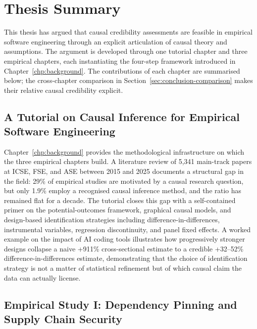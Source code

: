 \section{Thesis Summary}
\label{sec:conclusion-summary}

This thesis has argued that causal credibility assessments are feasible in empirical software engineering through an explicit articulation of causal theory and assumptions.
The argument is developed through one tutorial chapter and three empirical chapters, each instantiating the four-step framework introduced in Chapter~\ref{chp:background}.
The contributions of each chapter are summarised below; the cross-chapter comparison in Section~\ref{sec:conclusion-comparison} makes their relative causal credibility explicit.

\subsection{A Tutorial on Causal Inference for Empirical Software Engineering}

Chapter~\ref{chp:background} provides the methodological infrastructure on which the three empirical chapters build.
A literature review of 5{,}341 main-track papers at ICSE, FSE, and ASE between 2015 and 2025 documents a structural gap in the field: 29\% of empirical studies are motivated by a causal research question, but only 1.9\% employ a recognised causal inference method, and the ratio has remained flat for a decade.
The tutorial closes this gap with a self-contained primer on the potential-outcomes framework, graphical causal models, and design-based identification strategies including difference-in-differences, instrumental variables, regression discontinuity, and panel fixed effects.
A worked example on the impact of AI coding tools illustrates how progressively stronger designs collapse a naive +911\% cross-sectional estimate to a credible +32--52\% difference-in-differences estimate, demonstrating that the choice of identification strategy is not a matter of statistical refinement but of which causal claim the data can actually license.

\subsection{Empirical Study I: Dependency Pinning and Supply Chain Security}

